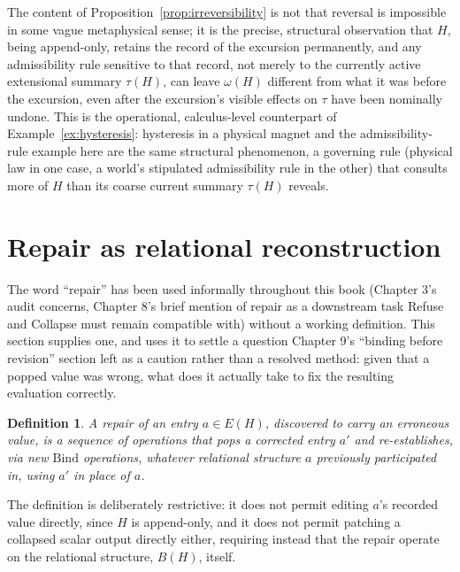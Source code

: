 \documentclass[11pt]{book}
\newtheorem{definition}[theorem]{Definition}
\begin{document}
The content of Proposition~\ref{prop:irreversibility} is not that reversal is impossible in some vague metaphysical sense; it is the precise, structural observation that $H$, being append-only, retains the record of the excursion permanently, and any admissibility rule sensitive to that record, not merely to the currently active extensional summary $\tau(H)$, can leave $\omega(H)$ different from what it was before the excursion, even after the excursion's visible effects on $\tau$ have been nominally undone. This is the operational, calculus-level counterpart of Example~\ref{ex:hysteresis}: hysteresis in a physical magnet and the admissibility-rule example here are the same structural phenomenon, a governing rule (physical law in one case, a world's stipulated admissibility rule in the other) that consults more of $H$ than its coarse current summary $\tau(H)$ reveals.

\section{Repair as relational reconstruction}

The word ``repair'' has been used informally throughout this book (Chapter 3's audit concerns, Chapter 8's brief mention of repair as a downstream task Refuse and Collapse must remain compatible with) without a working definition. This section supplies one, and uses it to settle a question Chapter 9's ``binding before revision'' section left as a caution rather than a resolved method: given that a popped value was wrong, what does it actually take to fix the resulting evaluation correctly.

\begin{definition}
A \emph{repair} of an entry $a\in E(H)$, discovered to carry an erroneous value, is a sequence of operations that pops a corrected entry $a'$ and re-establishes, via new $\mathrm{Bind}$ operations, whatever relational structure $a$ previously participated in, using $a'$ in place of $a$.
\end{definition}

The definition is deliberately restrictive: it does not permit editing $a$'s recorded value directly, since $H$ is append-only, and it does not permit patching a collapsed scalar output directly either, requiring instead that the repair operate on the relational structure, $B(H)$, itself.
\end{document}
